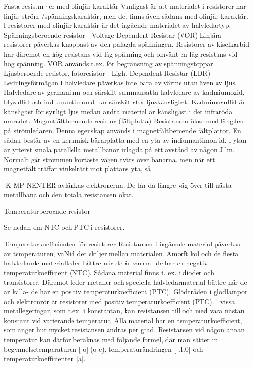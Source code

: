 Fasta resistm·er med olinjär karaktär
Vanligast är att materialet i resistorer har
linjär ström-/spänningskaraktär, men det
finns även sådana med olinjär karaktär. l
resistorer med olinjär karaktär är det ingående materialet av halvledartyp.
Spänningsberoende resistor
- Voltage Dependent Resistar (VOR)
Linjära resistorer påverkas knappast av den
pålagda spänningen. Resistorer av kiselkarbid har däremot en hög resistans vid låg
spänning och omvänt en låg resistans vid
hög spänning. VOR används t.ex. för begränsning av spänningstoppar.
Ljusberoende resistor, fotoresistor
- Light Dependent Resistar (LDR)
Ledningsförmågan i halvledare påverkas inte
bara av värme utan även av ljus. Halvledare
av germanium och särskilt sammansatta
halvledare av kadmiumoxid, blysulfid och
indiumantimonid har särskilt stor ljuskänslighet. Kadmiumsulfid är känsligast för synligt ljus medan andra material är känsligast i
det infraröda området.
Magnetfältberoende resistor (fältplatta)
Resistansen ökar med längden på strömledaren. Denna egenskap används i magnetfältberoende fältplattor. En sådan består
av en keramisk bärarplatta med en yta av
indiumantimon id. l ytan är ytterst smala parallella metallbanor inlagda på ett avstånd av
någon J.lm. Normalt går strömmen kortaste
vägen tvärs över banorna, men när ett magnetfält träffar vinkelrätt mot plattans yta, så

K MP NENTER
avlänkas elektronerna. De får då längre väg
över till nästa metallbana och den totala
resistansen ökar.

Temperaturberoende resistor

Se nedan om NTC och PTC i resistorer.

Temperaturkoefficienten för resistorer
Resistansen i ingående material påverkas
av temperaturen, vaNid det skiljer mellan
materialen.
Amorft kol och de flesta halvledande
materialleder bättre när de är varma- de har
en negativ temperaturkoefficient (NTC). Sådana material finns t. ex. i dioder och transistorer.
Däremot leder metaller och speciella
halvledarmaterial bättre när de är kalla- de
har en positiv temperaturkoefficient (PTC).
Glödtråden i glödlampor och elektronrör är
resistorer med positiv temperaturkoefficient
(PTC). l vissa metallegeringar, som t.ex. i
konstantan, kan resistansen till och med
vara nästan konstant vid varierande temperatur.
Alla material har en temperaturkoefficient,
som anger hur mycket resistansen ändras
per grad. Resistansen vid någon annan temperatur kan därför beräknas med följande
formel, där man sätter in begynnelsetemperaturen [ o] (o c), temperaturändringen [ .1.0]
och temperaturkoefficienten [a].

